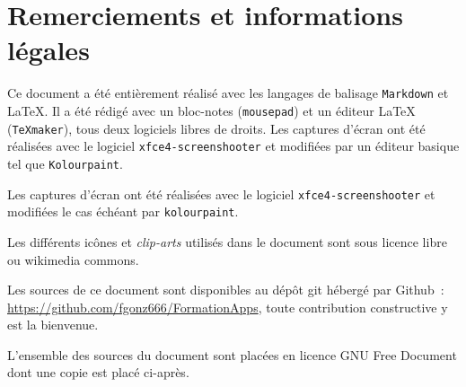 \chapter{Remerciements et informations légales}

Ce document a été entièrement réalisé avec les langages de balisage \texttt{Markdown} et \LaTeX{}. 
Il a été rédigé avec un bloc-notes (\texttt{mousepad}) et un éditeur \LaTeX{} (\texttt{\TeX{}maker}), tous deux logiciels libres de droits.
Les captures d'écran ont été réalisées avec le logiciel \texttt{xfce4-screenshooter} et modifiées par un éditeur basique tel que \texttt{Kolourpaint}.

Les captures d'écran ont été réalisées avec le logiciel \texttt{xfce4-screenshooter} et modifiées le cas échéant par \texttt{kolourpaint}.

Les différents icônes et \emph{clip-arts\/} utilisés dans le document sont sous licence libre ou wikimedia commons.

Les sources de ce document sont disponibles au dépôt git hébergé par Github~: \url{https://github.com/fgonz666/FormationApps}, toute contribution constructive y est la bienvenue.

L'ensemble des sources du document sont placées en licence GNU Free Document dont une copie est placé ci-après.

